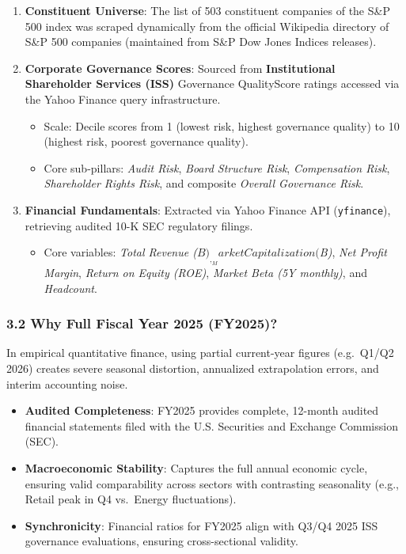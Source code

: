 \documentclass[
]{article}
\providecommand{\tightlist}{%
  \setlength{\itemsep}{0pt}\setlength{\parskip}{0pt}}
\begin{document}
\begin{enumerate}
\def\labelenumi{\arabic{enumi}.}
\tightlist
\item
  \textbf{Constituent Universe}: The list of 503 constituent companies
  of the S\&P 500 index was scraped dynamically from the official
  Wikipedia directory of S\&P 500 companies (maintained from S\&P Dow
  Jones Indices releases).
\item
  \textbf{Corporate Governance Scores}: Sourced from
  \textbf{Institutional Shareholder Services (ISS)} Governance
  QualityScore ratings accessed via the Yahoo Finance query
  infrastructure.

  \begin{itemize}
  \tightlist
  \item
    Scale: Decile scores from 1 (lowest risk, highest governance
    quality) to 10 (highest risk, poorest governance quality).
  \item
    Core sub-pillars: \emph{Audit Risk}, \emph{Board Structure Risk},
    \emph{Compensation Risk}, \emph{Shareholder Rights Risk}, and
    composite \emph{Overall Governance Risk}.
  \end{itemize}
\item
  \textbf{Financial Fundamentals}: Extracted via Yahoo Finance API
  (\texttt{yfinance}), retrieving audited 10-K SEC regulatory filings.

  \begin{itemize}
  \tightlist
  \item
    Core variables: \emph{Total Revenue
    (\(B)_, _Market Capitalization (\)B)}, \emph{Net Profit Margin},
    \emph{Return on Equity (ROE)}, \emph{Market Beta (5Y monthly)}, and
    \emph{Headcount}.
  \end{itemize}
\end{enumerate}

\subsubsection{3.2 Why Full Fiscal Year 2025
(FY2025)?}\label{why-full-fiscal-year-2025-fy2025}

In empirical quantitative finance, using partial current-year figures
(e.g.~Q1/Q2 2026) creates severe seasonal distortion, annualized
extrapolation errors, and interim accounting noise.

\begin{itemize}
\tightlist
\item
  \textbf{Audited Completeness}: FY2025 provides complete, 12-month
  audited financial statements filed with the U.S. Securities and
  Exchange Commission (SEC).
\item
  \textbf{Macroeconomic Stability}: Captures the full annual economic
  cycle, ensuring valid comparability across sectors with contrasting
  seasonality (e.g., Retail peak in Q4 vs.~Energy fluctuations).
\item
  \textbf{Synchronicity}: Financial ratios for FY2025 align with Q3/Q4
  2025 ISS governance evaluations, ensuring cross-sectional validity.
\end{itemize}
\end{document}
